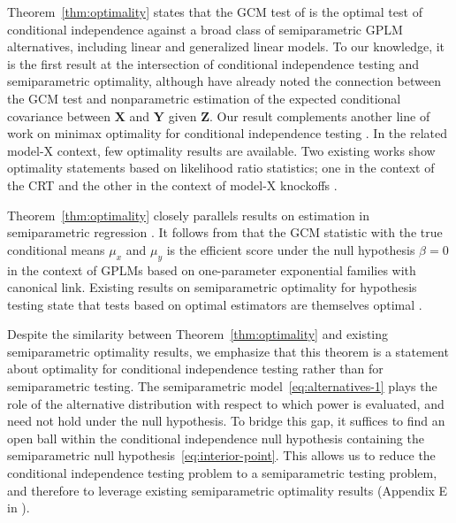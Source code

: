 \documentclass[aos]{imsart}
\theoremstyle{plain}
\theoremstyle{remark}
\newcommand{\prx}{\bm X}								%
\newcommand{\prz}{\bm Z}								%
\newcommand{\pry}{{\bm Y}}								%
\begin{document}
Theorem~\ref{thm:optimality} states that the GCM test of \citet{Shah2018} is the optimal test of conditional independence against a broad class of semiparametric GPLM alternatives, including linear and generalized linear models. To our knowledge, it is the first result at the intersection of conditional independence testing and semiparametric optimality, although \citet{Shah2018} have already noted the connection between the GCM test and nonparametric estimation of the expected conditional covariance between $\prx$ and $\pry$ given $\prz$. Our result complements another line of work on minimax optimality for conditional independence testing \citep{Canonne2018, Neykov2021, Kim2021}. In the related model-X context, few optimality results are available. Two existing works show optimality statements based on likelihood ratio statistics; one in the context of the CRT \citep{Katsevich2020a} and the other in the context of model-X knockoffs \citep{Spector2022a}.

Theorem~\ref{thm:optimality} closely parallels results on estimation in semiparametric regression \citep{Robinson1988, Bickel1993,Donald1994, Hardle2000, Robins2001, VanDeGeer2014, Ning2017, Jankova2018a, Chernozhukov2018}. It follows from \citet{Bickel1993, Robins2001} that the GCM statistic with the true conditional means $\mu_x$ and $\mu_y$ is the efficient score under the null hypothesis $\beta = 0$ in the context of GPLMs based on one-parameter exponential families with canonical link. Existing results on semiparametric optimality for hypothesis testing state that tests based on optimal estimators are themselves optimal \citep{Choi1996, VDV1998, Kosorok2008}.

Despite the similarity between Theorem~\ref{thm:optimality} and existing semiparametric optimality results, we emphasize that this theorem is a statement about optimality for conditional independence testing rather than for semiparametric testing. The semiparametric model~\eqref{eq:alternatives-1} plays the role of the alternative distribution with respect to which power is evaluated, and need not hold under the null hypothesis. To bridge this gap, it suffices to find an open ball within the conditional independence null hypothesis containing the semiparametric null hypothesis~\eqref{eq:interior-point}. This allows us to reduce the conditional independence testing problem to a semiparametric testing problem, and therefore to leverage existing semiparametric optimality results (Appendix E in \cite{supplementary}).
\end{document}
